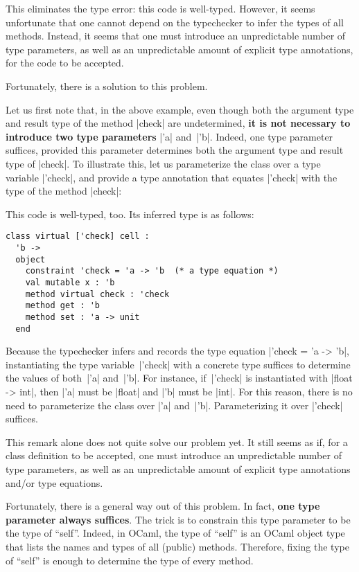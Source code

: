 \documentclass[11pt,a4paper,twoside]{article}
\renewcommand{\emph}[1]{\textbf{#1}}
\begin{document}
This eliminates the type error: this code is well-typed. However, it seems
unfortunate that one cannot depend on the typechecker to infer the types of
all methods. Instead, it seems that one must introduce an unpredictable number
of type parameters, as well as an unpredictable amount of explicit type
annotations, for the code to be accepted.

Fortunately, there is a solution to this problem.

Let us first note that, in the above example, even though both the argument
type and result type of the method \oc|check| are undetermined, \emph{it is
  not necessary to introduce two type parameters} \oc|'a| and~\oc|'b|. Indeed,
one type parameter suffices, provided this parameter determines both the
argument type and result type of \oc|check|. To illustrate this, let us
parameterize the class over a type variable \oc|'check|, and provide a type
annotation that equates \oc|'check| with the type of the method \oc|check|:
%

This code is well-typed, too. Its inferred type is as follows:
%
\begin{mdframed}[backgroundcolor=green!10]
\begin{lstlisting}
class virtual ['check] cell :
  'b ->
  object
    constraint 'check = 'a -> 'b  (* a type equation *)
    val mutable x : 'b
    method virtual check : 'check
    method get : 'b
    method set : 'a -> unit
  end
\end{lstlisting}
\end{mdframed}

Because the typechecker infers and records the type equation %
\oc|'check = 'a -> 'b|, instantiating the type variable~\oc|'check| with a
concrete type suffices to determine the values of both~\oc|'a| and~\oc|'b|.
For instance, if~\oc|'check| is instantiated with \oc|float -> int|, then
\oc|'a| must be \oc|float| and \oc|'b| must be \oc|int|. For this reason,
there is no need to parameterize the class over \oc|'a| and~\oc|'b|.
Parameterizing it over \oc|'check| suffices.

This remark alone does not quite solve our problem yet. It still seems as if,
for a class definition to be accepted, one must introduce an unpredictable
number of type parameters, as well as an unpredictable amount of explicit type
annotations and/or type equations.

Fortunately, there is a general way out of this problem. In fact, \emph{one
  type parameter always suffices}. The trick is to constrain this type
parameter to be the type of ``self''. Indeed, in OCaml, the type of ``self''
is an OCaml object type that lists the names and types of all (public)
methods. Therefore, fixing the type of ``self'' is enough to determine the
type of every method.
\end{document}
